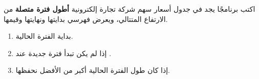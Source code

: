 \begin{statement}
اكتب برنامجًا يجد في جدول أسعار سهم شركة تجارة إلكترونية \textbf{أطول فترة متصلة} من الارتفاع المتتالي، ويعرض فهرسي بدايتها ونهايتها وقيمها.
\end{statement}
\begin{stepsbox}\begin{enumerate}
\item {} بداية الفترة الحالية.
\item إذا لم يكن  تبدأ فترة جديدة عند .
\item إذا كان طول الفترة الحالية  أكبر من الأفضل نحفظها.
\end{enumerate}\end{stepsbox}
